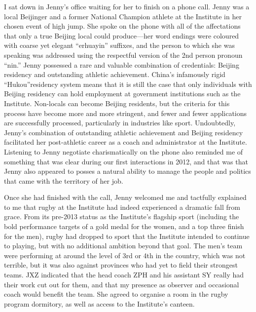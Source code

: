 I sat down in Jenny's office waiting for her to finish on a phone call. Jenny was a local Beijinger and a former National Champion athlete at the Institute in her chosen event of high jump. She spoke on the phone with all of the affectations that only a true Beijing local could produce---her word endings were coloured with coarse yet elegant ``erhuayin'' suffixes, and the person to which she was speaking was addressed using the respectful version of the 2nd person pronoun ``nin.''  Jenny possessed a rare and valuable combination of credentials: Beijing residency and outstanding athletic achievement.  China's infamously rigid ``Hukou''residency system means that it is still the case that only individuals with Beijing residency can hold employment at government institutions such as the Institute.  Non-locals can become Beijing residents, but the criteria for this process have become more and more stringent, and fewer and fewer applications are successfully processed, particularly in industries like sport.  Undoubtedly, Jenny's combination of outstanding athletic achievement and Beijing residency facilitated her post-athletic career as a coach and administrator at the Institute.  Listening to Jenny negotiate charismatically on the phone also reminded me of something that was clear during our first interactions in 2012, and that was that Jenny also appeared to posses a natural ability to manage the people and politics that came with the territory of her job.

Once she had finished with the call, Jenny welcomed me and tactfully explained to me that rugby at the Institute had indeed experienced a dramatic fall from grace. From its pre-2013 status as the Institute's flagship sport (including the bold performance targets of a gold medal for the women, and a top three finish for the men), rugby had dropped to sport that the Institute intended to continue to playing, but with no additional ambition beyond that goal. The men's team were performing at around the level of 3rd or 4th in the country, which was not terrible, but it was also against provinces who had yet to field their strongest teams.  JXZ indicated that the head coach ZPH and his assistant SY really had their work cut out for them, and that my presence as observer and occasional coach would benefit the team.  She agreed to organise a room in the rugby program dormitory, as well as access to the Institute's canteen.




